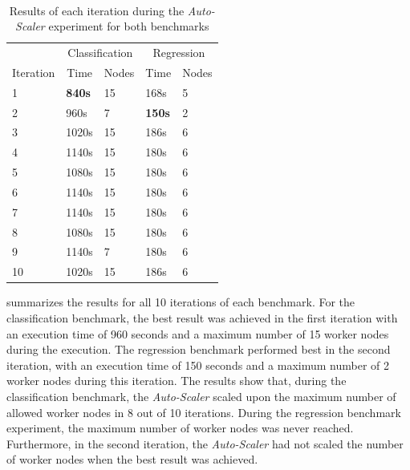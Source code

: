\paragraph{}
\begin{table}[ht]
\centering
\begin{tabular}{@{}l|ll|ll@{}}
\toprule
                               & \multicolumn{2}{c|}{Classification}                   & \multicolumn{2}{c}{Regression}                       \\
\multicolumn{1}{c|}{Iteration} & \multicolumn{1}{c}{Time} & \multicolumn{1}{c|}{Nodes} & \multicolumn{1}{c}{Time} & \multicolumn{1}{c}{Nodes} \\ \midrule
1  & \textbf{840s} & 15 & 168s          & 5 \\
2  & 960s          & 7  & \textbf{150s} & 2 \\
3  & 1020s         & 15 & 186s          & 6 \\
4  & 1140s         & 15 & 180s          & 6 \\
5  & 1080s         & 15 & 180s          & 6 \\
6  & 1140s         & 15 & 180s          & 6 \\
7  & 1140s         & 15 & 180s          & 6 \\
8  & 1080s         & 15 & 180s          & 6 \\
9  & 1140s         & 7  & 180s          & 6 \\
10 & 1020s         & 15 & 186s          & 6 \\ \bottomrule
\end{tabular}
\caption{Results of each iteration during the \textit{Auto-Scaler} experiment for both benchmarks}
\label{table:07_auto-scaler_iterations}
\end{table}
 summarizes the results for all 10 iterations of each benchmark.
For the classification benchmark, the best result was achieved in the first iteration with an execution time of 960 seconds and a maximum number of 15 worker nodes during the execution.
The regression benchmark performed best in the second iteration, with an execution time of 150 seconds and a maximum number of 2 worker nodes during this iteration.
The results show that, during the classification benchmark, the \textit{Auto-Scaler} scaled upon the maximum number of allowed worker nodes in 8 out of 10 iterations. During the regression benchmark experiment, the maximum number of worker nodes was never reached. Furthermore, in the second iteration, the \textit{Auto-Scaler} had not scaled the number of worker nodes when the best result was achieved.


